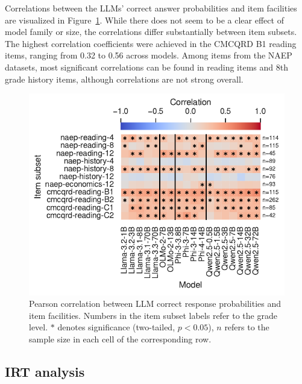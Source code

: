 \documentclass[11pt]{article}
\begin{document}
Correlations between the LLMs' correct answer probabilities and item facilities are visualized in Figure~\ref{fig:ctt-correlation}. While there does not seem to be a clear effect of model family or size, the correlations differ substantially between item subsets. The highest correlation coefficients were achieved in the CMCQRD B1 reading items, ranging from 0.32 to 0.56 across models. Among items from the NAEP datasets, most significant correlations can be found in reading items and 8th grade history items, although correlations are not strong overall.

\begin{figure}
  \centering
  \includegraphics[width=\columnwidth]{figures/ctt-correlation.pdf}
  \caption{Pearson correlation between LLM correct response probabilities and item facilities. Numbers in the item subset labels refer to the grade level. $*$ denotes significance (two-tailed, $p < 0.05$), $n$ refers to the sample size in each cell of the corresponding row.}
  \label{fig:ctt-correlation}
\end{figure}

\subsection{IRT analysis}
\end{document}
